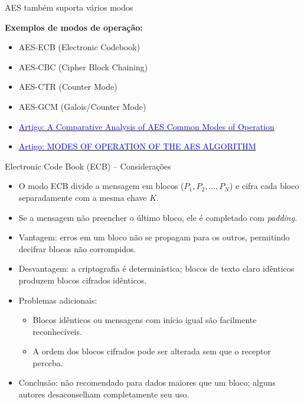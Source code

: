 \begin{frame}{AES também suporta vários modos}

    \textbf{Exemplos de modos de operação:}
    \begin{itemize}
        \item AES-ECB (Electronic Codebook)
        \item AES-CBC (Cipher Block Chaining)
        \item AES-CTR (Counter Mode)
        \item AES-GCM (Galois/Counter Mode)
        \item \href{https://ieeexplore.ieee.org/stamp/stamp.jsp?arnumber=7946655&casa_token=xII8ag99IPsAAAAA:p362qc3e09WXdTSoT4jOMXCsgCvsdOqc6QuPWiYXum-XcZB1BVzeB9OkdaigwbC5qQYOcDscAw}{\textcolor{blue}{Artigo: A Comparative Analysis of AES Common Modes of Operation}}
        \item \href{https://ciit.finki.ukim.mk/data/papers/10CiiT/10CiiT-46.pdf}{\textcolor{blue}{Artigo: MODES OF OPERATION OF THE AES ALGORITHM}}
    \end{itemize}

\end{frame}

\begin{frame}{Electronic Code Book (ECB) – Considerações}
    \begin{itemize}
        \item O modo ECB divide a mensagem em blocos ($P_1, P_2, \dots, P_N$) e cifra cada bloco separadamente com a mesma chave $K$.
        \item Se a mensagem não preencher o último bloco, ele é completado com \textit{padding}.
        \item Vantagem: erros em um bloco não se propagam para os outros, permitindo decifrar blocos não corrompidos.
        \item Desvantagem: a criptografia é determinística; blocos de texto claro idênticos produzem blocos cifrados idênticos.
        \item Problemas adicionais:
              \begin{itemize}
                  \item Blocos idênticos ou mensagens com início igual são facilmente reconhecíveis.
                  \item A ordem dos blocos cifrados pode ser alterada sem que o receptor perceba.
              \end{itemize}
        \item Conclusão: não recomendado para dados maiores que um bloco; alguns autores desaconselham completamente seu uso.
    \end{itemize}
\end{frame}


